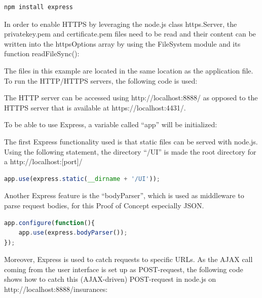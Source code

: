 \begin{lstlisting}[language=javascript,caption={Installing Express via command-line}]
npm install express 
\end{lstlisting}

In order to enable HTTPS by leveraging the node.js class https.Server, the privatekey.pem and certificate.pem files need to be read and their content can be written into the httpsOptions array by using the FileSystem module and its function readFileSync():



The files in this example are located in the same location as the application file. To run the HTTP/HTTPS servers, the following code is used:



The HTTP server can be accessed using http://localhost:8888/ as opposed to the HTTPS server that is available at https://localhost:4431/.

To be able to use Express, a variable called “app” will be initialized:



The first Express functionality used is that static files can be served with node.js. Using the following statement, the directory “/UI” is made the root directory for a http://localhost:[port]/

\begin{lstlisting}[language=javascript,caption={Serving static assets with Express}]
app.use(express.static(__dirname + '/UI'));
\end{lstlisting}

Another Express feature is the “bodyParser”, which is used as middleware to parse request bodies, for this Proof of Concept especially JSON.

\begin{lstlisting}[language=javascript,caption={Using the bodyParser}]
app.configure(function(){
    app.use(express.bodyParser());
});
\end{lstlisting}

Moreover, Express is used to catch requests to specific URLs. As the AJAX call coming from the user interface is set up as POST-request, the following code shows how to catch this (AJAX-driven) POST-request in node.js on http://localhost:8888/insurances:

